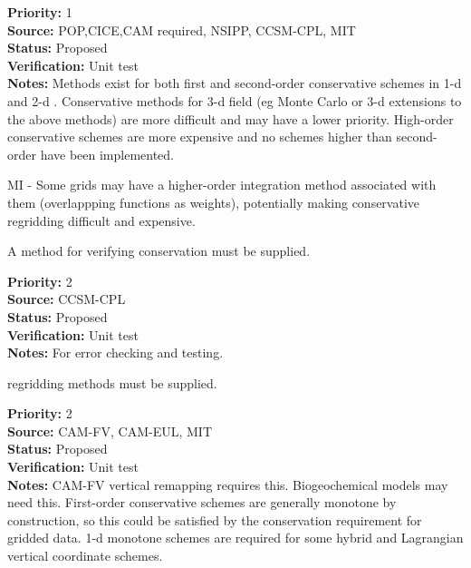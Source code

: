 \begin{reqlist}
{\bf Priority:} 1 \\
{\bf Source:} POP,CICE,CAM required, NSIPP, CCSM-CPL, MIT \\
{\bf Status:} Proposed \\
{\bf Verification:} Unit test \\
{\bf Notes:} Methods exist for both first and second-order
             conservative schemes in 1-d and 2-d \cite{Jones1999}.
             Conservative methods for 3-d field (eg Monte Carlo
             or 3-d extensions to the above methods) are more difficult
             and may have a lower priority.
             High-order conservative schemes are more expensive and
             no schemes higher than second-order have been implemented.

             MI - Some grids may have a higher-order integration method
             associated with them (overlappping functions as weights),
             potentially making conservative regridding difficult and expensive.
\end{reqlist}


A method for verifying conservation must be supplied.

\begin{reqlist}
{\bf Priority:} 2 \\
{\bf Source:} CCSM-CPL \\
{\bf Status:} Proposed \\
{\bf Verification:} Unit test \\
{\bf Notes:} For error checking and testing.
\end{reqlist}


 regridding methods must be supplied.

\begin{reqlist}
{\bf Priority:} 2 \\
{\bf Source:} CAM-FV, CAM-EUL, MIT \\
{\bf Status:} Proposed \\
{\bf Verification:} Unit test \\
{\bf Notes:} CAM-FV vertical remapping requires this.
	     Biogeochemical models may need this.  First-order
             conservative schemes are generally monotone by
             construction, so this could be satisfied by the
             conservation requirement for gridded data.
             1-d monotone schemes are required for some hybrid
             and Lagrangian vertical coordinate schemes.
\end{reqlist}



